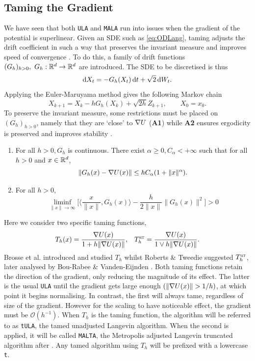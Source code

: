 \subsection{Taming the Gradient}
We have seen that both \texttt{ULA} and \texttt{MALA} run into issues when the gradient of the potential is superlinear. Given an SDE such as \eqref{eq:ODLang}, taming adjusts the drift coefficient in such a way that preserves the invariant measure and improves speed of convergence \cite{Brosse18tULA,RT96,Sabanis13}. To do this, a family of drift functions \((G_h)_{h>0}, \ G_h:\mathbb{R}^d \to \mathbb{R}^d\) are introduced. The SDE to be discretised is thus
	\begin{equation*} \mathop{}\!\mathrm{d} X_t = -G_h(X_t)\mathop{}\!\mathrm{d} t +\sqrt{2}\mathop{}\!\mathrm{d} W_t. \end{equation*}
Applying the Euler-Maruyama method gives the following Markov chain
	\[X_{k+1} =X_k-hG_h(X_k)+\sqrt{2h}Z_{k+1},\qquad  X_0=x_0.\]
To preserve the invariant measure, some restrictions must be placed on \((G_h)_{h>0}\), namely that they are `close' to \(\nabla U\) ({\bf A1}) while {\bf A2} ensures ergodicity is preserved and improves stability \cite{Brosse18tULA}. 

\begin{enumerate}[label={\bf A{\arabic*}}]
	\item  For all \(h>0, G_h\) is continuous. There exist \(\alpha\geq 0, C_{\alpha}<+\infty\) such that for all \(h >0 \) and \(x \in \mathbb{R}^d\),
		\[\|G_h(x)-\nabla U(x)\| \leq hC_{\alpha}(1+\|x\|^{\alpha}).\]\label{A1}
	\item For all \(h>0\),
		\[ \liminf_{\|x\|\to \infty} \bigg\lbrack \bigg\langle \frac{x}{\|x\|}, G_h(x)\bigg\rangle - \frac{h}{2\|x\|}\|G_h(x)\|^2\bigg\rbrack >0\]\label{A2}
\end{enumerate}
Here we consider two specific taming functions,
 \begin{align*}
 T_h(x) = \frac{\nabla U(x)}{1+h\|\nabla U(x)\|}, &&  T^{\text{\sc \tiny RT}}_h = \frac{\nabla U(x)}{1\vee h\|\nabla U(x)\|}.
 \end{align*}
Brosse et al. introduced and studied \(T_h\) whilst Roberts \& Tweedie suggested \(T^{\text{\sc \tiny RT}}_h\), later analysed by Bou-Rabee \& Vanden-Eijnden \cite{BV10MALTA,Brosse18tULA,RT96}. Both taming functions retain the direction of the gradient, only reducing the magnitude of its effect. The latter is the usual \texttt{ULA} until the gradient gets large enough \((\|\grad U(x)\|> 1/h)\), at which point it begins normalising. In contrast, the first will always tame, regardless of size of the gradient. However for the scaling to have noticeable effect, the gradient must be \(\mathcal{O}(h^{-1})\).
When \(T_h\) is the taming function, the algorithm will be referred to as \texttt{tULA}, the tamed unadjusted Langevin algorithm. When the second is applied, it will be called \texttt{MALTA}, the Metropolis adjusted Langevin truncated algorithm after \cite{RT96}. Any tamed algorithm using \(T_h\) will be prefixed with a lowercase \texttt{t}.
